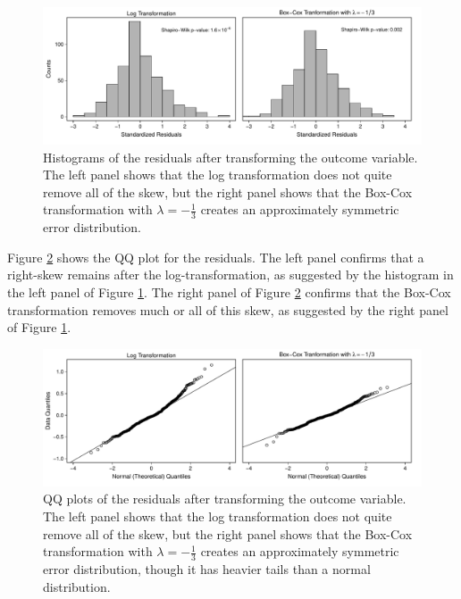 \documentclass[12pt]{article}
\begin{document}
\begin{figure}[h!]
\begin{center}
\includegraphics[width = \textwidth]{figs/cg-trans-residuals-hist.pdf}
\caption{Histograms of the residuals after transforming the outcome variable. 
The left panel shows that the log transformation does not quite remove all of the skew, but the right panel shows that the Box-Cox transformation with $\lambda = -\frac{1}{3}$ creates an approximately symmetric error distribution.}\label{fig:cg-trans-residuals-hist}
\end{center}
\end{figure}

Figure \ref{fig:cg-trans-qq-plot} shows the QQ plot for the residuals. 
The left panel confirms that a right-skew remains after the log-transformation, as suggested by the histogram in the left panel of Figure \ref{fig:cg-trans-residuals-hist}. 
The right panel of Figure \ref{fig:cg-trans-qq-plot} confirms that the Box-Cox transformation removes much or all of this skew, as suggested by the right panel of Figure \ref{fig:cg-trans-residuals-hist}. 

\begin{figure}[h!]
\begin{center}
\includegraphics[width = \textwidth]{figs/cg-trans-qq-plot.pdf}
\caption{QQ plots of the residuals after transforming the outcome variable.
The left panel shows that the log transformation does not quite remove all of the skew, but the right panel shows that the Box-Cox transformation with $\lambda = -\frac{1}{3}$ creates an approximately symmetric error distribution, though it has heavier tails than a normal distribution.}\label{fig:cg-trans-qq-plot}
\end{center}
\end{figure}
\end{document}
